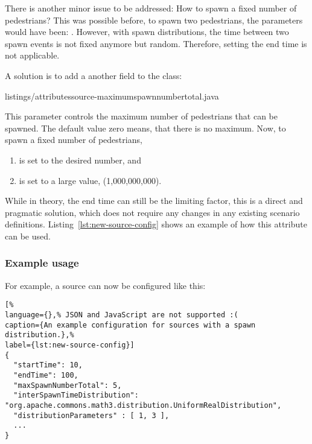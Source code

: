 There is another minor issue to be addressed: How to spawn a fixed number of
pedestrians?
This was possible before, \eg to spawn two pedestrians, the parameters would
have been: .
However, with spawn distributions, the time between two spawn events is not
fixed anymore but random.
Therefore, setting the end time is not applicable.

A solution is to add a another field to the  class:

%
{listings/attributessource-maximumspawnnumbertotal.java}

This parameter controls the maximum number of pedestrians that can be spawned.
The default value zero means, that there is no maximum.
Now, to spawn a fixed number of pedestrians,

\begin{enumerate}

  \item {} is set to the desired number, and

  \item {} is set to a large value, \eg {} (1,000,000,000).

\end{enumerate}

While in theory, the end time can still be the limiting factor, this is a direct
and pragmatic solution, which does not require any changes in any existing
scenario definitions.
Listing~\ref{lst:new-source-config} shows an example of how this attribute can
be used.

\subsubsection{Example usage}

For example, a source can now be configured like this:

\begin{lstlisting}[%
language={},% JSON and JavaScript are not supported :(
caption={An example configuration for sources with a spawn distribution.},%
label={lst:new-source-config}]
{
  "startTime": 10,
  "endTime": 100,
  "maxSpawnNumberTotal": 5,
  "interSpawnTimeDistribution": "org.apache.commons.math3.distribution.UniformRealDistribution",
  "distributionParameters" : [ 1, 3 ],
  ...
}
\end{lstlisting}

